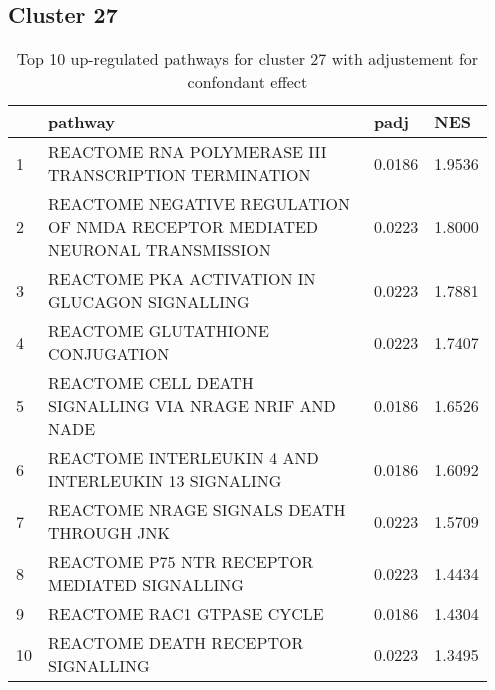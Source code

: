 \documentclass{article}
\begin{document}
\subsection{Cluster 27 }
\begin{table}[H]
\centering
\begin{tabular}{p{0.05\linewidth}p{0.7\linewidth}p{0.1\linewidth}p{0.1\linewidth}}
  \hline
 & pathway & padj & NES \\ 
  \hline
1 & REACTOME RNA POLYMERASE III TRANSCRIPTION TERMINATION & 0.0186 & 1.9536 \\ 
  2 & REACTOME NEGATIVE REGULATION OF NMDA RECEPTOR MEDIATED NEURONAL TRANSMISSION & 0.0223 & 1.8000 \\ 
  3 & REACTOME PKA ACTIVATION IN GLUCAGON SIGNALLING & 0.0223 & 1.7881 \\ 
  4 & REACTOME GLUTATHIONE CONJUGATION & 0.0223 & 1.7407 \\ 
  5 & REACTOME CELL DEATH SIGNALLING VIA NRAGE NRIF AND NADE & 0.0186 & 1.6526 \\ 
  6 & REACTOME INTERLEUKIN 4 AND INTERLEUKIN 13 SIGNALING & 0.0186 & 1.6092 \\ 
  7 & REACTOME NRAGE SIGNALS DEATH THROUGH JNK & 0.0223 & 1.5709 \\ 
  8 & REACTOME P75 NTR RECEPTOR MEDIATED SIGNALLING & 0.0223 & 1.4434 \\ 
  9 & REACTOME RAC1 GTPASE CYCLE & 0.0186 & 1.4304 \\ 
  10 & REACTOME DEATH RECEPTOR SIGNALLING & 0.0223 & 1.3495 \\ 
   \hline
\end{tabular}
\caption{Top 10 up-regulated pathways for cluster 27 with adjustement for confondant effect} 
\label{tab:q3_2_conf_27}
\end{table}
\end{document}
